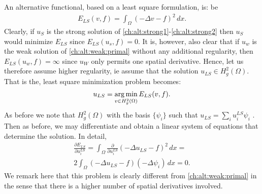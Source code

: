 An alternative functional, based on a least square formulation, is: 
be  
\begin{align}
E_{LS}(v, f) = \int_\Omega (-\Delta v - f)^2 \, dx .  
\end{align}
Clearly, if $u_S$ is the strong solution of \eqref{ch:alt:strong1}-\eqref{ch:alt:strong2} then $u_S$ would minimize $E_{LS}$ since
$E_{LS}(u_s, f) = 0$.    
It is, however, also clear that if $u_w$ is the weak solution of \ref{ch:alt:weak:primal}
without any additional regularity, then $E_{LS}(u_w, f) = \infty$ since $u_W$ only permits one spatial derivative.     
Hence, let us therefore assume higher regularity, ie assume that the solution $u_{LS} \in H^2_g(\Omega)$. That
is the, least square minimization problem becomes: 
\begin{align}
u_{LS} = \operatorname*{arg\,min}_{v \in H^2_g(\Omega)} E_{LS} (v, f) .   
\end{align}
As before we note that $H^2_g(\Omega)$ with the basis $\{\psi_i\}$   
such that $u_{LS} = \sum_i  u^{LS}_i \psi_i$ .  
Then as before, we may differentiate and obtain a linear system of equations that determine the solution. In detail,  
\begin{align} 
\label{weak:primal:ls}
\frac{\partial E_{LS}}{\partial u^{LS}_i} = \int_\Omega \frac{\partial}{\partial u^{LS}_i} (-\Delta u_{LS} - f)^2 \, dx  = \\  
2 \int_\Omega (-\Delta u_{LS} - f) (-\Delta \psi_i) \, dx = 0 .   
\end{align} 
We remark here that this problem is clearly different from \eqref{ch:alt:weak:primal} in the sense that there is a higher 
number of spatial derivatives involved. 

